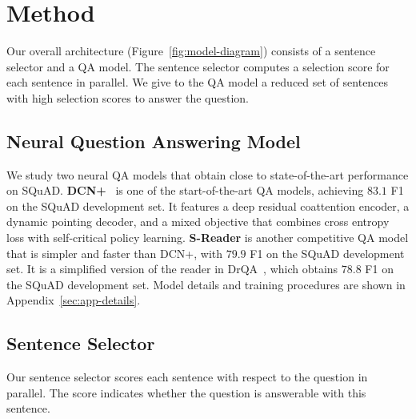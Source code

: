 \documentclass[11pt,a4paper]{article}
\begin{document}
 \section{Method}\label{sec:method}\begin{figure*}[!tb]
\centering
{}
\caption{
Our model architecture.
(a) Overall pipeline, consisting of sentence selector and QA model. Selection score of each sentence is obtained in parallel, then sentences with selection score above the threshold are merged and fed into QA model.
(b) Shared encoder of sentence selector and S-Reader (QA Model), which takes document and the question as inputs and outputs the document encodings $D^{enc}$ and question encodings $Q^{enc}$.
(c) Decoder of S-Reader (QA Model), which takes $D^{enc}$ and $Q^{enc}$ as inputs and outputs the scores for start and end positions.
(d) Decoder of sentence selector, which takes $D^{enc}$ and $Q^{enc}$ for each sentence and outputs the score indicating if the question is answerable given the sentence.
}
\label{fig:model-diagram}
\end{figure*}

Our overall architecture (Figure~\ref{fig:model-diagram}) consists of a sentence selector and a QA model. The sentence selector computes a selection score for each sentence in parallel. We give to the QA model a reduced set of sentences with high selection scores to answer the question.

\subsection{Neural Question Answering Model}\label{sec:method-qa-model}
We study two neural QA models that obtain close to state-of-the-art performance on SQuAD.
{\bf DCN+}~\cite{dcn+} is one of the start-of-the-art QA models, achieving $83.1$ F1 on the SQuAD development set. It features a deep residual coattention encoder, a dynamic pointing decoder, and a mixed objective that combines cross entropy loss with self-critical policy learning.
{\bf S-Reader} is another competitive QA model that is simpler and faster than DCN+, with $79.9$ F1 on the SQuAD development set.
It is a simplified version of the reader in DrQA~\cite{squad-open}, which obtains $78.8$ F1 on the SQuAD development set.
Model details and training procedures are shown in Appendix~\ref{sec:app-details}.

\subsection{Sentence Selector}\label{sec:method-sent-sel}
Our sentence selector scores each sentence with respect to the question in parallel. The score indicates whether the question is answerable with this sentence.
\end{document}
